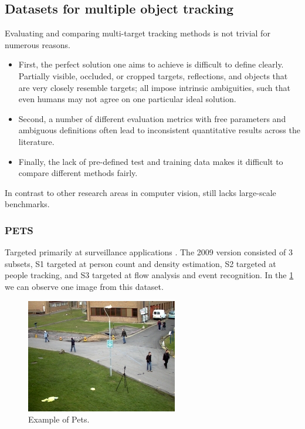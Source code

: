 \documentclass[12pt, a4paper, titlepage,twoside,openright]{article}
\begin{document}
\subsection{Datasets for multiple object tracking}

Evaluating and comparing multi-target tracking methods is not trivial for numerous reasons. 

\begin{itemize}

\item First, the perfect solution one aims to achieve is difficult to define clearly. Partially visible, occluded, or cropped targets, reflections, and objects that are very closely resemble targets; all impose intrinsic ambiguities, such that even humans may not agree on one particular ideal solution.

\item Second, a number of different evaluation metrics with free parameters and ambiguous definitions often lead to inconsistent quantitative results across the literature.

\item Finally, the lack of pre-defined test and training data makes it difficult to compare different methods fairly.

\end{itemize}


In contrast to other research areas in computer vision, still lacks large-scale benchmarks.

\subsubsection{PETS}

Targeted primarily at surveillance applications \cite{pets}. The 2009 version consisted of 3 subsets, S1 targeted at person count and density estimation, S2 targeted at people tracking, and S3 targeted at flow analysis and event recognition. In the \ref{petsExample} we can observe one image from this dataset.

\begin{figure}[H]
\centering         
\includegraphics[width=0.5\linewidth]{datasetTracking/View_001.jpg}
\caption{Example of Pets.} \label{petsExample}
\end{figure}
\end{document}
